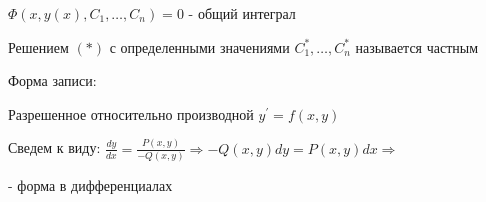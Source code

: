 \documentclass[12pt]{article}
\begin{document}
    \Nota $\displaystyle \Phi(x, y(x), C_1, \dots, C_n) = 0$ - общий интеграл

     Решением $(*)$ с определенными значениями $\displaystyle C_1^*, \dots, C_n^*$ называется частным

    \Nota Форма записи:

    Разрешенное относительно производной $\displaystyle y^\prime = f(x, y)$

    Сведем к виду: $\displaystyle \frac{dy}{dx} = \frac{P(x, y)}{-Q(x, y)} \Longrightarrow -Q(x, y)dy = P(x, y)dx \Longrightarrow $

     - форма в дифференциалах
\end{document}
